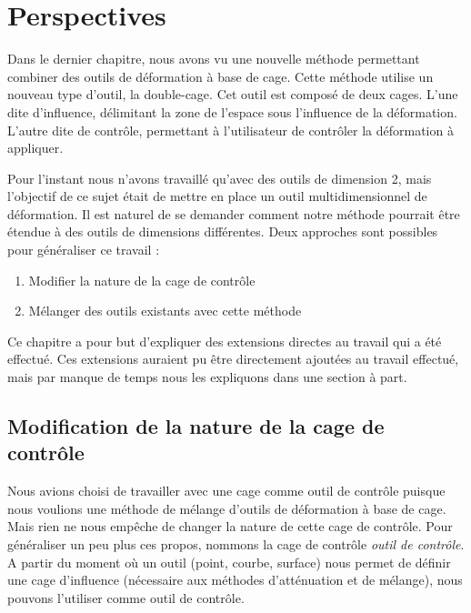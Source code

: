 

\chapter{Perspectives}

\graphicspath{ {Chapter4/Chapter4Figs/PNG/}
  {Chapter4/Chapter4Figs/PDF/} {Chapter4/Chapter4Figs/} }

Dans le dernier chapitre, nous avons vu une nouvelle méthode permettant
combiner des outils de déformation à base de cage. Cette méthode utilise un
nouveau type d'outil, la double-cage. Cet outil est composé de deux cages.
L'une dite d'influence, délimitant la zone de l'espace sous l'influence de la
déformation. L'autre dite de contrôle, permettant à l'utilisateur de contrôler
la déformation à appliquer.

Pour l'instant nous n'avons travaillé qu'avec des outils de dimension 2, mais
l'objectif de ce sujet était de mettre en place un outil multidimensionnel de
déformation. Il est naturel de se demander comment notre méthode pourrait être
étendue à des outils de dimensions différentes. Deux approches sont possibles
pour généraliser ce travail :

\begin{enumerate}
\item Modifier la nature de la cage de contrôle
\item Mélanger des outils existants avec cette méthode
\end{enumerate}

Ce chapitre a pour but d'expliquer des extensions directes au travail qui a
été effectué. Ces extensions auraient pu être directement ajoutées au travail
effectué, mais par manque de temps nous les expliquons dans une section à
part.

\section{Modification de la nature de la cage de contrôle}

Nous avions choisi de travailler avec une cage comme outil de contrôle puisque
nous voulions une méthode de mélange d'outils de déformation à base de cage.
Mais rien ne nous empêche de changer la nature de cette cage de contrôle. Pour
généraliser un peu plus ces propos, nommons la cage de contrôle \textit{outil
de contrôle}. A partir du moment où un outil (point, courbe, surface) nous permet
de définir une cage d'influence (nécessaire aux méthodes d'atténuation et de
mélange), nous pouvons l'utiliser comme outil de contrôle.

